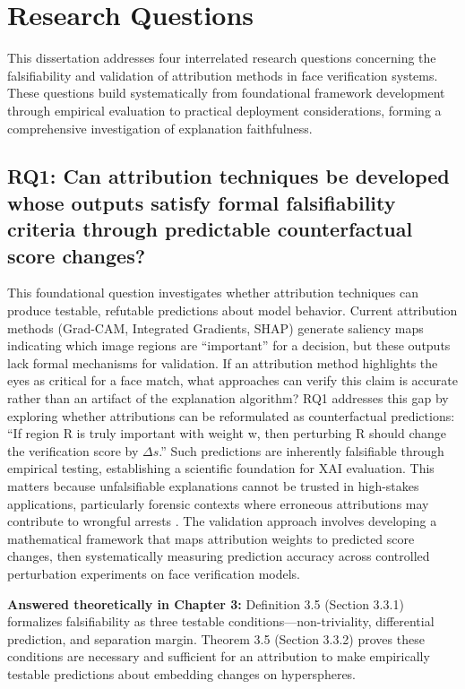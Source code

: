 \section{Research Questions}
\label{sec:research_questions}

This dissertation addresses four interrelated research questions concerning the falsifiability and validation of attribution methods in face verification systems. These questions build systematically from foundational framework development through empirical evaluation to practical deployment considerations, forming a comprehensive investigation of explanation faithfulness.

\subsection*{RQ1: Can attribution techniques be developed whose outputs satisfy formal falsifiability criteria through predictable counterfactual score changes?}

This foundational question investigates whether attribution techniques can produce testable, refutable predictions about model behavior. Current attribution methods (Grad-CAM, Integrated Gradients, SHAP) \cite{selvaraju2019gradcam,Sundararajan2017_IG,lundberg2017unified} generate saliency maps indicating which image regions are ``important'' for a decision, but these outputs lack formal mechanisms for validation. If an attribution method highlights the eyes as critical for a face match, what approaches can verify this claim is accurate rather than an artifact of the explanation algorithm? RQ1 addresses this gap by exploring whether attributions can be reformulated as counterfactual predictions: ``If region R is truly important with weight w, then perturbing R should change the verification score by $\Delta s$.'' Such predictions are inherently falsifiable through empirical testing, establishing a scientific foundation for XAI evaluation. This matters because unfalsifiable explanations cannot be trusted in high-stakes applications, particularly forensic contexts where erroneous attributions may contribute to wrongful arrests \cite{nrc2009strengthening,hill2020detroit}. The validation approach involves developing a mathematical framework that maps attribution weights to predicted score changes, then systematically measuring prediction accuracy across controlled perturbation experiments on face verification models.

\vspace{0.3cm}
\noindent\textbf{Answered theoretically in Chapter 3:} Definition 3.5 (Section 3.3.1) formalizes falsifiability as three testable conditions---non-triviality, differential prediction, and separation margin. Theorem 3.5 (Section 3.3.2) proves these conditions are necessary and sufficient for an attribution to make empirically testable predictions about embedding changes on hyperspheres.

